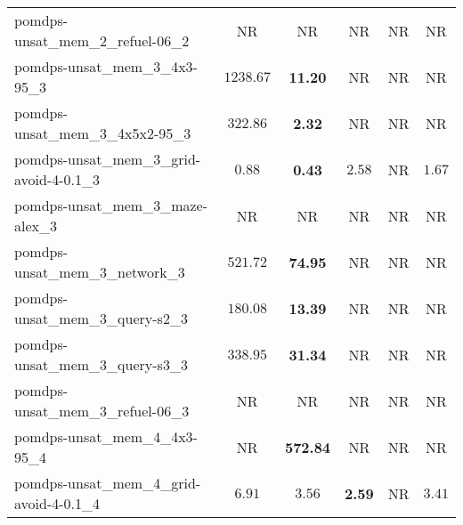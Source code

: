 \begin{tabular}{lccccc}
pomdps-unsat\_mem\_2\_refuel-06\_2 & NR & NR & NR & NR & NR \\
pomdps-unsat\_mem\_3\_4x3-95\_3 & $1238.67$ & \textbf{11.20} & NR & NR & NR \\
pomdps-unsat\_mem\_3\_4x5x2-95\_3 & $322.86$ & \textbf{2.32} & NR & NR & NR \\
pomdps-unsat\_mem\_3\_grid-avoid-4-0.1\_3 & $0.88$ & \textbf{0.43} & $2.58$ & NR & $1.67$ \\
pomdps-unsat\_mem\_3\_maze-alex\_3 & NR & NR & NR & NR & NR \\
pomdps-unsat\_mem\_3\_network\_3 & $521.72$ & \textbf{74.95} & NR & NR & NR \\
pomdps-unsat\_mem\_3\_query-s2\_3 & $180.08$ & \textbf{13.39} & NR & NR & NR \\
pomdps-unsat\_mem\_3\_query-s3\_3 & $338.95$ & \textbf{31.34} & NR & NR & NR \\
pomdps-unsat\_mem\_3\_refuel-06\_3 & NR & NR & NR & NR & NR \\
pomdps-unsat\_mem\_4\_4x3-95\_4 & NR & \textbf{572.84} & NR & NR & NR \\
pomdps-unsat\_mem\_4\_grid-avoid-4-0.1\_4 & $6.91$ & $3.56$ & \textbf{2.59} & NR & $3.41$ \\
\bottomrule
\end{tabular}
